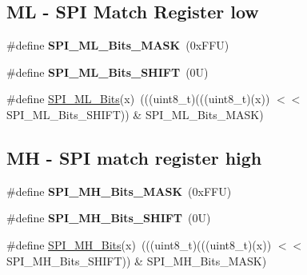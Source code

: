 \subsection*{ML -\/ S\+PI Match Register low}
\begin{DoxyCompactItemize}
\item 
\mbox{\label{group___s_p_i___register___masks_ga68f178e75fdd2455b48a93b0adb40946}} 
\#define {\bfseries S\+P\+I\+\_\+\+M\+L\+\_\+\+Bits\+\_\+\+M\+A\+SK}~(0x\+F\+F\+U)
\item 
\mbox{\label{group___s_p_i___register___masks_ga648aa372a023cce7266b05150e0e3830}} 
\#define {\bfseries S\+P\+I\+\_\+\+M\+L\+\_\+\+Bits\+\_\+\+S\+H\+I\+FT}~(0\+U)
\item 
\#define \mbox{\hyperlink{group___s_p_i___register___masks_ga8620b124087f8e852385abed5aa2ca36}{S\+P\+I\+\_\+\+M\+L\+\_\+\+Bits}}(x)~(((uint8\+\_\+t)(((uint8\+\_\+t)(x)) $<$$<$ S\+P\+I\+\_\+\+M\+L\+\_\+\+Bits\+\_\+\+S\+H\+I\+FT)) \& S\+P\+I\+\_\+\+M\+L\+\_\+\+Bits\+\_\+\+M\+A\+SK)
\end{DoxyCompactItemize}
\subsection*{MH -\/ S\+PI match register high}
\begin{DoxyCompactItemize}
\item 
\mbox{\label{group___s_p_i___register___masks_gaa4cbb3a51e4c35e341dd5440c08bfda2}} 
\#define {\bfseries S\+P\+I\+\_\+\+M\+H\+\_\+\+Bits\+\_\+\+M\+A\+SK}~(0x\+F\+F\+U)
\item 
\mbox{\label{group___s_p_i___register___masks_ga871c81eb6f67f7219dc7a6b103345aa2}} 
\#define {\bfseries S\+P\+I\+\_\+\+M\+H\+\_\+\+Bits\+\_\+\+S\+H\+I\+FT}~(0\+U)
\item 
\#define \mbox{\hyperlink{group___s_p_i___register___masks_ga97f5b41ce9dc92ac214cf5c593b69def}{S\+P\+I\+\_\+\+M\+H\+\_\+\+Bits}}(x)~(((uint8\+\_\+t)(((uint8\+\_\+t)(x)) $<$$<$ S\+P\+I\+\_\+\+M\+H\+\_\+\+Bits\+\_\+\+S\+H\+I\+FT)) \& S\+P\+I\+\_\+\+M\+H\+\_\+\+Bits\+\_\+\+M\+A\+SK)
\end{DoxyCompactItemize}
